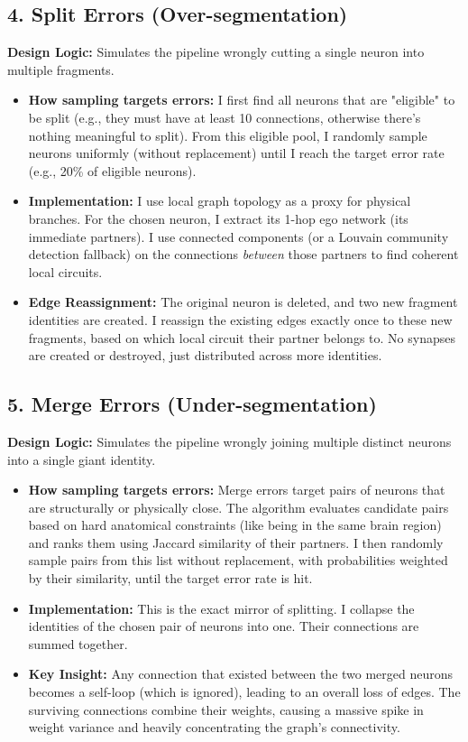 \documentclass[11pt]{article}
\begin{document}
\subsection*{4. Split Errors (Over-segmentation)}
\textbf{Design Logic:} Simulates the pipeline wrongly cutting a single neuron into multiple fragments.
\begin{itemize}
    \item \textbf{How sampling targets errors:} I first find all neurons that are "eligible" to be split (e.g., they must have at least 10 connections, otherwise there's nothing meaningful to split). From this eligible pool, I randomly sample neurons uniformly (without replacement) until I reach the target error rate (e.g., 20\% of eligible neurons).
    \item \textbf{Implementation:} I use local graph topology as a proxy for physical branches. For the chosen neuron, I extract its 1-hop ego network (its immediate partners). I use connected components (or a Louvain community detection fallback) on the connections \emph{between} those partners to find coherent local circuits.
    \item \textbf{Edge Reassignment:} The original neuron is deleted, and two new fragment identities are created. I reassign the existing edges exactly once to these new fragments, based on which local circuit their partner belongs to. No synapses are created or destroyed, just distributed across more identities.
\end{itemize}

\subsection*{5. Merge Errors (Under-segmentation)}
\textbf{Design Logic:} Simulates the pipeline wrongly joining multiple distinct neurons into a single giant identity.
\begin{itemize}
    \item \textbf{How sampling targets errors:} Merge errors target pairs of neurons that are structurally or physically close. The algorithm evaluates candidate pairs based on hard anatomical constraints (like being in the same brain region) and ranks them using Jaccard similarity of their partners. I then randomly sample pairs from this list without replacement, with probabilities weighted by their similarity, until the target error rate is hit.
    \item \textbf{Implementation:} This is the exact mirror of splitting. I collapse the identities of the chosen pair of neurons into one. Their connections are summed together. 
    \item \textbf{Key Insight:} Any connection that existed between the two merged neurons becomes a self-loop (which is ignored), leading to an overall loss of edges. The surviving connections combine their weights, causing a massive spike in weight variance and heavily concentrating the graph's connectivity.
\end{itemize}
\end{document}

